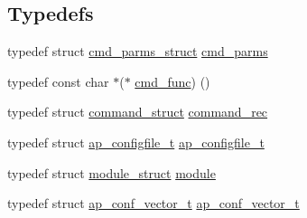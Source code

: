 \subsection*{Typedefs}
\begin{DoxyCompactItemize}
\item 
typedef struct \hyperlink{structcmd__parms__struct}{cmd\+\_\+parms\+\_\+struct} \hyperlink{group__APACHE__CORE__CONFIG_ga1791fbd28d06a9847bad001541c5241e}{cmd\+\_\+parms}
\item 
typedef const char $\ast$($\ast$ \hyperlink{group__APACHE__CORE__CONFIG_gad46309b45efbf192bb44197ed4e37b5f}{cmd\+\_\+func}) ()
\item 
typedef struct \hyperlink{structcommand__struct}{command\+\_\+struct} \hyperlink{group__APACHE__CORE__CONFIG_ga79f84e70f072880482a3fd004ae48710}{command\+\_\+rec}
\item 
typedef struct \hyperlink{structap__configfile__t}{ap\+\_\+configfile\+\_\+t} \hyperlink{group__APACHE__CORE__CONFIG_ga223feaeca3495bb572d50f40fcd9cc9b}{ap\+\_\+configfile\+\_\+t}
\item 
typedef struct \hyperlink{structmodule__struct}{module\+\_\+struct} \hyperlink{group__APACHE__CORE__CONFIG_ga0ea4f633a5f9f88e1603aaeb1f2b2e69}{module}
\item 
typedef struct \hyperlink{group__APACHE__CORE__CONFIG_ga614684670dbf748a70ac6bad272da59c}{ap\+\_\+conf\+\_\+vector\+\_\+t} \hyperlink{group__APACHE__CORE__CONFIG_ga614684670dbf748a70ac6bad272da59c}{ap\+\_\+conf\+\_\+vector\+\_\+t}
\end{DoxyCompactItemize}
